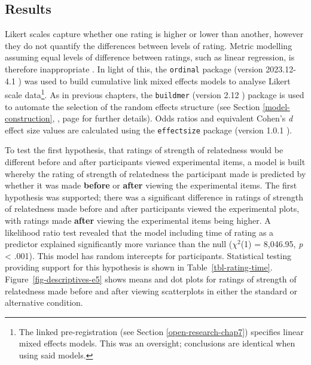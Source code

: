 \documentclass[../main.tex]{subfiles}
\begin{document}
\subsection{Results}\label{results-e5}

Likert scales capture whether one rating is higher or lower than
another, however they do not quantify the differences between levels of
rating. Metric modelling assuming equal levels of difference between
ratings, such as linear regression, is therefore inappropriate
\cite{liddell_2018}. In light of this, the \texttt{ordinal} package
(version 2023.12-4.1 \cite{ordinal}) was used to build cumulative link
mixed effects models to analyse Likert scale data\footnote{The linked
  pre-registration (see Section \ref{open-research-chap7}) specifies
  linear mixed effects models. This was an oversight; conclusions are
  identical when using said models.}. As in previous chapters, the
\texttt{buildmer} (version 2.12 \cite{buildmer}) package is used to
automate the selection of the random effects structure (see Section
\ref{model-construction}, , page
\pageref{model-construction} for further details). Odds ratios and
equivalent Cohen's \emph{d} effect size values are calculated using the
\texttt{effectsize} package (version 1.0.1 \cite{effectsize}).

To test the first hypothesis, that ratings of strength of relatedness
would be different before and after participants viewed experimental
items, a model is built whereby the rating of strength of relatedness
the participant made is predicted by whether it was made \textbf{before}
or \textbf{after} viewing the experimental items. The first hypothesis
was supported; there was a significant difference in ratings of strength
of relatedness made before and after participants viewed the
experimental plots, with ratings made \textbf{after} viewing the
experimental items being higher. A likelihood ratio test revealed that
the model including time of rating as a predictor explained
significantly more variance than the null (\(\chi^2\)(1) = 8,046.95,
\emph{p} \textless{} .001). This model has random intercepts for
participants. Statistical testing providing support for this hypothesis
is shown in Table~\ref{tbl-rating-time}.
Figure~\ref{fig-descriptives-e5} shows means and dot plots for ratings
of strength of relatedness made before and after viewing scatterplots in
either the standard or alternative condition.
\end{document}

